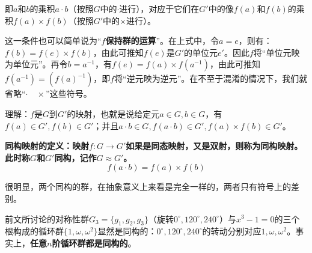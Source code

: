 \documentclass[12pt]{article}
\begin{document}
即$a$和$b$的乘积$a \cdot b$（按照$G$中的$\cdot$进行），对应于它们在$G'$中的像$f(a)$和$f(b)$的乘积$f(a) \times f(b)$（按照$G'$中的$\times$进行）。

这一条件也可以简单说为“$f$\textbf{保持群的运算}”。在上式中，令$a = e$，则有：$f(b) = f(e) \times f(b)$，由此可推知$f(e)$是$G'$的单位元$e'$。因此$f$将“单位元映为单位元”。再令$b = a^{-1}$，有$f(e) = f(a) \times f(a^{-1})$，由此可推知$f(a^{-1}) = (f(a)^{-1})$，即$f$将“逆元映为逆元”。在不至于混淆的情况下，我们就省略“$\cdot \quad \times$”这些符号。

\begin{framed}
\small {
理解：$f$是$G$到$G'$的映射，也就是说给定元$a \in G, b \in G$，有 $f(a) \in G', f(b) \in G'$；并且$a \cdot b \in G, f(a \cdot b) \in G', f(a) \times f(b) \in G'$。
}
\end{framed}


\begin{mdframed}[
linecolor=black!40,outerlinewidth=1pt,roundcorner=.5em,innertopmargin=1ex,innerbottommargin=.5\baselineskip,innerrightmargin=1em,innerleftmargin=1em,backgroundcolor=gray!5,
]
\textbf{
同构映射的定义：映射$f:G \rightarrow G'$如果是同态映射，又是双射，则称为同构映射。此时称$G$和$G'$同构，记作$G \approx G'$。
$$
f(a\cdot b) = f(a) \times f(b)
$$
}
\end{mdframed}

很明显，两个同构的群，在抽象意义上来看是完全一样的，两者只有符号上的差别。
\begin{framed}
\small {
前文所讨论的对称性群$G_3 = \{g_1, g_2, g_3\}$（旋转$0^\circ, 120^\circ, 240^\circ$）与$x^3 - 1 = 0$的三个根构成的循环群$\{1, \omega, \omega^2\}$显然是同构的：$0^\circ, 120^\circ, 240^\circ$的转动分别对应$1, \omega, \omega^2$。事实上，\textbf{任意$n$阶循环群都是同构的}。
}
\end{framed}
\end{document}
